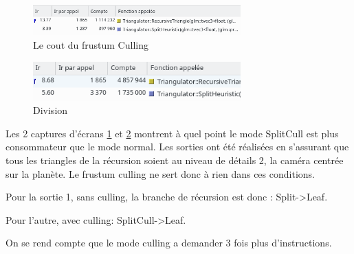  
 \begin{figure}
        \centerline{\includegraphics[width=8cm]{img/noCullingVal.png}}
        \caption{Le cout du frustum Culling}
        \label{fig:perfNoCulling}
 \end{figure}
 
 \begin{figure}
        \centerline{\includegraphics[width=8cm]{img/cullingAfterFixValgrind.png}}
        \caption{Division}
        \label{fig:perfCulling}
 \end{figure}
 Les 2 captures d'écrans \ref{fig:perfNoCulling} et \ref{fig:perfCulling} montrent à quel point le mode SplitCull est plus consommateur que le mode normal.  Les sorties ont été réalisées en s'assurant que tous les triangles de la récursion soient au niveau de détails 2, la caméra centrée sur la planète. Le frustum culling ne sert donc à rien dans ces conditions.
 
 
 Pour la sortie 1, sans culling, la branche de récursion est donc :
 \newline
 Split->Leaf.

Pour l'autre, avec culling:
 \newline
 SplitCull->Leaf.
 
 On se rend compte que le mode culling a demander 3 fois plus d'instructions.
 